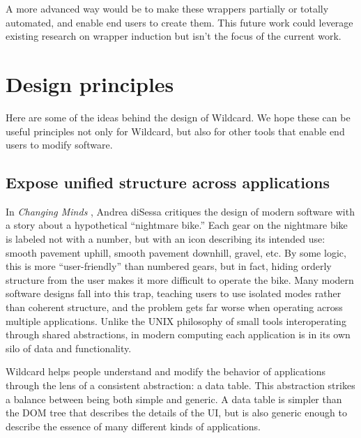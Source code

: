 \documentclass[english,submission]{programming}
\begin{document}
A more advanced way would be to make these wrappers partially or totally
automated, and enable end users to create them. This future work could
leverage existing research on wrapper induction but isn't the focus of
the current work.

\hypertarget{design-principles}{%
\section{Design principles}\label{design-principles}}

Here are some of the ideas behind the design of Wildcard. We hope these
can be useful principles not only for Wildcard, but also for other tools
that enable end users to modify software.

\hypertarget{expose-unified-structure-across-applications}{%
\subsection{Expose unified structure across
applications}\label{expose-unified-structure-across-applications}}

In \emph{Changing Minds} \autocite{disessa2000}, Andrea diSessa
critiques the design of modern software with a story about a
hypothetical ``nightmare bike.'' Each gear on the nightmare bike is
labeled not with a number, but with an icon describing its intended use:
smooth pavement uphill, smooth pavement downhill, gravel, etc. By some
logic, this is more ``user-friendly'' than numbered gears, but in fact,
hiding orderly structure from the user makes it more difficult to
operate the bike. Many modern software designs fall into this trap,
teaching users to use isolated modes rather than coherent structure, and
the problem gets far worse when operating across multiple applications.
Unlike the UNIX philosophy of small tools interoperating through shared
abstractions, in modern computing each application is in its own silo of
data and functionality.

Wildcard helps people understand and modify the behavior of applications
through the lens of a consistent abstraction: a data table. This
abstraction strikes a balance between being both simple and generic. A
data table is simpler than the DOM tree that describes the details of
the UI, but is also generic enough to describe the essence of many
different kinds of applications.
\end{document}
